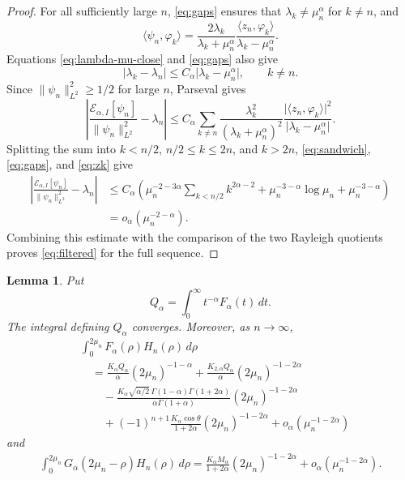 \documentclass[11pt]{amsart}
\numberwithin{equation}{section}
\newtheorem{lemma}[lemma]{Lemma}
\theoremstyle{remark}
\newcommand{\norm}[2][]{\lVert #2\rVert_{#1}}
\newcommand{\abs}[1]{\lvert #1\rvert}
\newcommand{\ip}[2]{\langle #1,#2\rangle}
\newcommand{\calE}{\mathcal E}
\begin{document}
\begin{proof}
For all sufficiently large $n$, \eqref{eq:gaps} ensures that
$\lambda_k\ne\mu_n^\alpha$ for $k\ne n$, and
\[
 \ip{\psi_n}{\varphi_k}
 =\frac{2\lambda_k}{\lambda_k+\mu_n^\alpha}
 \frac{\ip{z_n}{\varphi_k}}{\lambda_k-\mu_n^\alpha}.
\]
Equations \eqref{eq:lambda-mu-close} and \eqref{eq:gaps} also give
\[
 \abs{\lambda_k-\lambda_n}
 \le C_\alpha\abs{\lambda_k-\mu_n^\alpha},
 \qquad k\ne n.
\]
Since $\norm[L^2]{\psi_n}^2\ge1/2$ for large $n$, Parseval gives
\[
 \left|\frac{\calE_{\alpha,I}[\psi_n]}{\norm[L^2]{\psi_n}^2}
 -\lambda_n\right|
 \le C_\alpha\sum_{k\ne n}
 \frac{\lambda_k^2}{(\lambda_k+\mu_n^\alpha)^2}
 \frac{\abs{\ip{z_n}{\varphi_k}}^2}
 {\abs{\lambda_k-\mu_n^\alpha}}.
\]
Splitting the sum into $k<n/2$, $n/2\le k\le2n$, and $k>2n$,
\eqref{eq:sandwich}, \eqref{eq:gaps}, and \eqref{eq:zk} give
\[
 \begin{aligned}
 \left|\frac{\calE_{\alpha,I}[\psi_n]}{\norm[L^2]{\psi_n}^2}
 -\lambda_n\right|
 &\le C_\alpha\left(
 \mu_n^{-2-3\alpha}\sum_{k<n/2}k^{2\alpha-2}
 +\mu_n^{-3-\alpha}\log\mu_n
 +\mu_n^{-3-\alpha}\right)\\
 &=o_\alpha(\mu_n^{-2-\alpha}).
 \end{aligned}
\]
Combining this estimate with the comparison of the two Rayleigh quotients
proves \eqref{eq:filtered} for the full sequence.
\end{proof}


\begin{lemma}\label{lem:small-expansions}
Put
\[
 Q_\alpha=\int_0^\infty t^{-\alpha}F_\alpha(t)\,dt.
\]
The integral defining $Q_\alpha$ converges.  Moreover, as $n\to\infty$,
\begin{equation}\label{eq:FH-expansion}
\begin{aligned}
 &\int_0^{2\mu_n}F_\alpha(\rho)H_n(\rho)\,d\rho\\
 &\quad=\frac{K_\alpha Q_\alpha}{\alpha}(2\mu_n)^{-1-\alpha}
 +\frac{K_{2,\alpha}Q_\alpha}{\alpha}(2\mu_n)^{-1-2\alpha}\\
 &\qquad-\frac{K_\alpha\sqrt{\alpha/2}\,
 \Gamma(1-\alpha)\Gamma(1+2\alpha)}
 {\alpha\Gamma(1+\alpha)}(2\mu_n)^{-1-2\alpha}\\
 &\qquad+(-1)^{n+1}\frac{K_\alpha\cos\theta}{1+2\alpha}
 (2\mu_n)^{-1-2\alpha}
 +o_\alpha(\mu_n^{-1-2\alpha})
\end{aligned}
\end{equation}
and
\begin{equation}\label{eq:GH-expansion}
 \begin{aligned}
 \int_0^{2\mu_n}G_\alpha(2\mu_n-\rho)H_n(\rho)\,d\rho=\frac{K_\alpha M_\alpha}{1+2\alpha}
 (2\mu_n)^{-1-2\alpha}
 +o_\alpha(\mu_n^{-1-2\alpha}).
 \end{aligned}
\end{equation}
\end{lemma}
\end{document}

